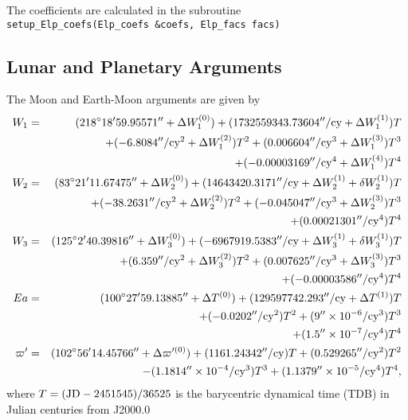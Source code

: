 \documentclass[12pt]{article}
\newcommand \beqn {\begin{eqnarray}}
\newcommand \eeqn {\end{eqnarray}}
\begin{document}
The coefficients are calculated in the subroutine \\
{\tt setup\_Elp\_coefs(Elp\_coefs \&coefs, Elp\_facs facs)}

\subsection{Lunar and Planetary Arguments} 

The Moon and Earth-Moon arguments are given by 
\beqn
  W_1 &=& (218^\circ 18' 59.95571'' + \Delta W_1^{(0)}) + 
(1732559343.73604''/{\rm cy} + \Delta W_1^{(1)}) T  \cr
&& + (-6.8084''/{\rm cy}^2 + \Delta W_1^{(2)}) T^2 
+ (0.006604''/{\rm cy}^3 + \Delta W_1^{(3)}) T^3 \cr
&&+ (-0.00003169''/{\rm cy}^4 + \Delta W_1^{(4)}) T^4 \\ 
  W_2 &=& (83^\circ 21' 11.67475'' + \Delta W_2^{(0)}) +
(14643420.3171''/{\rm cy} + \Delta W_2^{(1)} +\delta W_2^{(1)}) T  \cr
&& + (-38.2631''/{\rm cy}^2 + \Delta W_2^{(2)}) T^2
+ (-0.045047''/{\rm cy}^3 + \Delta W_2^{(3)}) T^3 \cr
&&+(0.00021301''/{\rm cy}^4) T^4 \\ 
  W_3 &=& (125^\circ 2' 40.39816'' + \Delta W_3^{(0)}) + 
(-6967919.5383''/{\rm cy} + \Delta W_3^{(1)} +\delta W_3^{(1)}) T  \cr
&& + (6.359''/{\rm cy}^2 + \Delta W_3^{(2)}) T^2
+ (0.007625''/{\rm cy}^3 + \Delta W_3^{(3)}) T^3 \cr
&&+(-0.00003586''/{\rm cy}^4) T^4 \\
  Ea &=& (100^\circ 27' 59.13885'' + \Delta T^{(0)}) +
(129597742.293''/{\rm cy} + \Delta T^{(1)}) T  \cr
&& + (-0.0202''/{\rm cy}^2) T^2
+ (9''\times 10^{-6}/{\rm cy}^3) T^3 \cr
&&+ (1.5''\times 10^{-7}/{\rm cy}^4) T^4 \\
  \varpi' &=& (102^\circ 56' 14.45766'' + \Delta \varpi'^{(0)}) + 
(1161.24342''/{\rm cy}) T + (0.529265''/{\rm cy}^2) T^2 \cr 
&& - (1.1814''\times 10^{-4}/{\rm cy}^3) T^3 + (1.1379''\times 10^{-5}/{\rm cy}^4) T^4 ,
\eeqn
where $T=({\rm JD}-2451545)/36525$ is the barycentric dynamical time (TDB) in
Julian centuries from J2000.0
\end{document}
